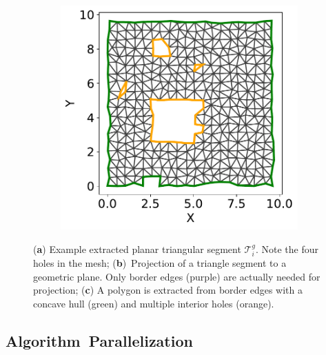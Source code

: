 \begin{figure}[H]
\begin{subfigure}[t]{.30\linewidth}
    \caption{\label{fig:ch3_polygon_extraction_b}}
  \end{subfigure}
  \hfill
  \begin{subfigure}[t]{.30\linewidth}
    \centering\includegraphics[clip,trim=0cm 0cm 0cm 0cm,width=.99\linewidth]{chapter_3_polylidar3d/imgs/polygon/PolygonExtraction_b2.pdf}
    \caption{\label{fig:ch3_polygon_extraction_c}}
  \end{subfigure}
  \caption{(\textbf{a}) Example extracted planar triangular segment $\mathcal{T}^{g}_i$. Note the four holes in the mesh; (\textbf{b})~Projection of a triangle segment to a geometric plane. Only border edges (purple) are actually needed for projection; (\textbf{c}) A polygon is extracted from border edges with a concave hull (green) and multiple interior holes (orange). }\label{fig:ch3_polygon_extraction}
\end{figure}



\subsection{Algorithm~Parallelization}\label{sec:ch3_methods_polylidar_parallel}


